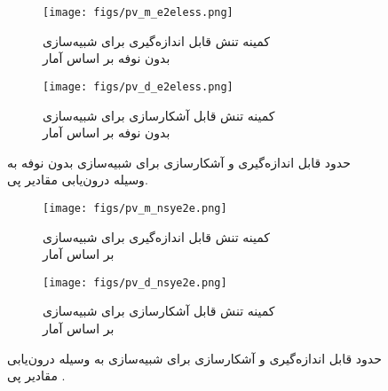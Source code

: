   	\begin{figure}
  		\centering
  		\begin{subfigure}{0.5\textwidth}
  			\centering
  			\texttt{[image: figs/pv\_m\_e2eless.png]}
  			\caption{   کمینه تنش قابل اندازه‌گیری برای شبیه‌سازی 
  				\\			
  				بدون نوفه بر اساس آمار
  				 }
  		\end{subfigure}%
  		\begin{subfigure}{0.5\textwidth}
  			\centering
  			\texttt{[image: figs/pv\_d\_e2eless.png]}
  			\caption{  کمینه تنش قابل آشکارسازی برای شبیه‌سازی 
  				\\ 		
  				بدون نوفه بر اساس آمار
  			}
  		\end{subfigure}
  		
  		\caption{حدود قابل اندازه‌گیری و آشکارسازی برای شبیه‌سازی 
  			بدون نوفه به وسیله درون‌یابی مقادیر پی.}
  		\label{fig:e2eless_pv}
  	\end{figure}
  	\begin{figure}[H]
  		\centering
  		\begin{subfigure}{0.5\textwidth}
  			\centering
  			\texttt{[image: figs/pv\_m\_nsye2e.png]}
  			\caption{   کمینه تنش قابل اندازه‌گیری برای شبیه‌سازی 
  				\\			
  				بر اساس آمار
  				 }
  		\end{subfigure}%
  		\begin{subfigure}{0.5\textwidth}
  			\centering
  			\texttt{[image: figs/pv\_d\_nsye2e.png]}
  			\caption{  کمینه تنش قابل آشکارسازی برای شبیه‌سازی 
  				\\ 		
  				بر اساس آمار 
  			}
  		\end{subfigure}
  		
  		\caption{حدود قابل اندازه‌گیری و آشکارسازی برای شبیه‌سازی 
  			به وسیله درون‌یابی مقادیر پی .}
  		\label{fig:nsyE2E_pv}
  	\end{figure}
